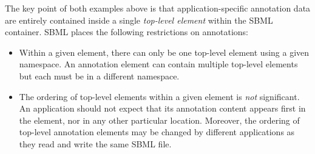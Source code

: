 The key point of both examples above is that application-specific
annotation data are entirely contained inside a single
\emph{top-level element} within the SBML 
container.  SBML \thisLV places the following
restrictions on annotations:
\begin{itemize}

\item Within a given  element, there can
  only be one top-level element using a given namespace.  An
  annotation element can contain multiple top-level elements but
  each must be in a different namespace.

  
\item The ordering of top-level elements within a given
   element is \emph{not} significant.  An
  application should not expect that its annotation content
  appears first in the  element, nor in any
  other particular location.  Moreover, the ordering of
    top-level annotation elements may be changed by
  different applications as they read and write the same
    SBML file.

\end{itemize}


